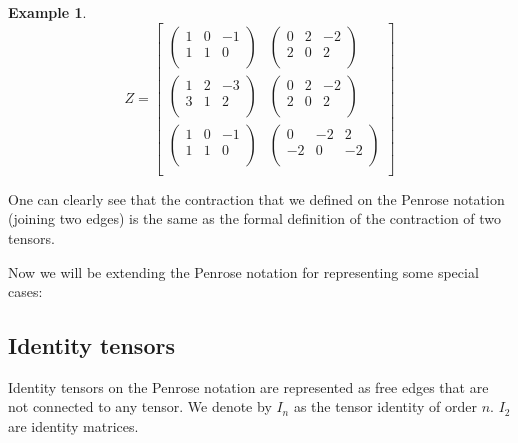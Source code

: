 \documentclass[11pt,a4paper,openright,oneside]{book}
\numberwithin{equation}{section}
\newtheorem{example0}[defn0]{Example}
\newenvironment{example}{ \begin{example0}\rm}{\end{example0}}
\begin{document}
\begin{example}
$$Z = \begin{bmatrix}
\begin{pmatrix}
    1 & 0 & -1 \\
    1 & 1 & 0 \\
\end{pmatrix} &
\begin{pmatrix}
    0 & 2 & -2 \\
    2 & 0 & 2 \\
\end{pmatrix} \\
\begin{pmatrix}
    1 & 2 & -3 \\
    3 & 1 & 2 \\
\end{pmatrix} &
\begin{pmatrix}
    0 & 2 & -2 \\
    2 & 0 & 2 \\
\end{pmatrix} \\
\begin{pmatrix}
    1 & 0 & -1 \\
    1 & 1 & 0 \\
\end{pmatrix} &
\begin{pmatrix}
    0 & -2 & 2 \\
    -2 & 0 & -2 \\
\end{pmatrix} \\
\end{bmatrix}$$
\label{ex:bigmatrix}
\end{example}

One can clearly see that the contraction that we defined on
the Penrose notation (joining two edges) is the same as the formal definition of the contraction of two tensors.

Now we will be extending the Penrose notation for representing some special cases:

\subsection* {Identity tensors}

Identity tensors on the Penrose notation are represented as free edges that are not connected to
any tensor. We denote by $I_n$ as the tensor identity of order $n$. $I_2$ are identity matrices.
\end{document}
